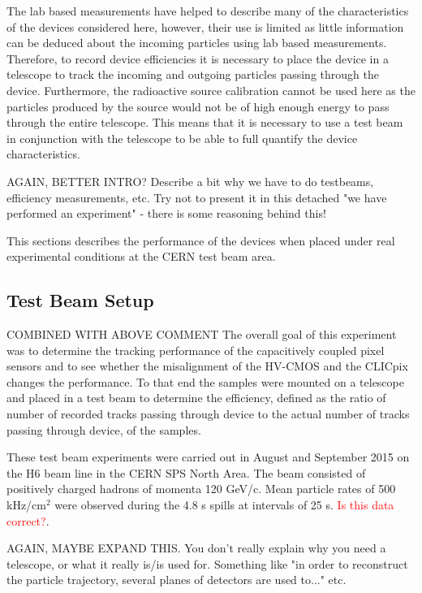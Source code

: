 
The lab based measurements have helped to describe many of the characteristics of the devices considered here, however, their use is limited as little information can be deduced about the incoming particles using lab based measurements.  Therefore, to record device efficiencies it is necessary to place the device in a telescope to track the incoming and outgoing particles passing through the device.  Furthermore, the radioactive source calibration cannot be used here as the particles produced by the source would not be of high enough energy to pass through the entire telescope.  This means that it is necessary to use a test beam in conjunction with the telescope to be able to full quantify the device characteristics.


AGAIN, BETTER INTRO? Describe a bit why we have to do testbeams, efficiency measurements, etc. Try not to present it in this detached "we have performed an experiment" - there is some reasoning behind this! 

This sections describes the performance of the devices when placed under real experimental conditions at the CERN test beam area.  


\subsection{Test Beam Setup}

COMBINED WITH ABOVE COMMENT
The overall goal of this experiment was to determine the tracking performance of the capacitively coupled pixel sensors and to see whether the misalignment of the HV-CMOS and the CLICpix changes the performance.  To that end the samples were mounted on a telescope and placed in a test beam to determine the efficiency, defined as the ratio of number of recorded tracks passing through device to the actual number of tracks passing through device, of the samples.  

These test beam experiments were carried out in August and September 2015 on the H6 beam line in the CERN SPS North Area.  The beam consisted of positively charged hadrons of momenta 120 GeV/c.  Mean particle rates of 500 kHz/cm$^{2}$ were observed during the 4.8 s spills at intervals of 25 s.  \textcolor{red}{Is this data correct?}.

AGAIN, MAYBE EXPAND THIS. You don't really explain why you need a telescope, or what it really is/is used for. Something like "in order to reconstruct the particle trajectory, several planes of detectors are used to..." etc.

